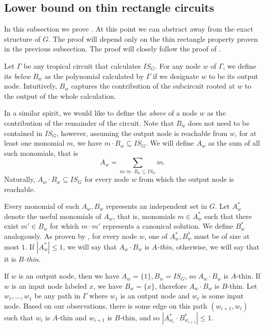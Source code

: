 \documentclass[11pt,a4paper]{article}
\begin{document}
\subsection{Lower bound on thin rectangle circuits}
In this subsection we prove . At this point we can abstract away from the exact structure of $G$. The proof will depend only on the thin rectangle property proven in the previous subsection. The proof will closely follow the proof of \cite[Lemma 2.18]{Jukna2023}.

Let $\Gamma$ be any tropical circuit that calculates $IS_G$. For any node $w$ of $\Gamma$, we define its \emph{below} $B_w$ as the polynomial calculated by $\Gamma$ if we designate $w$ to be its output node. Intuitively, $B_w$ captures the contribution of the subcircuit rooted at $w$ to the output of the whole calculation.

In a similar spirit, we would like to define the \emph{above} of a node $w$ as the contribution of the remainder of the circuit. Note that $B_w$ does not need to be contained in $IS_G$, however, assuming the output node is reachable from $w$, for at least one monomial $m$, we have $m \cdot B_w \subseteq IS_G$. We will define $A_w$ as the sum of all such monomials, that is
$$
    A_w = \sum_{m:m \cdot B_w \subseteq IS_G} m.
$$
Naturally, $A_w \cdot B_w \subseteq IS_G$ for every node $w$ from which the output node is reachable.

Every monomial of each $A_w, B_w$ represents an independent set in $G$. Let $A_w^*$ denote the useful monomials of $A_w$, that is, monomials $m \in A_w^*$ such that there exist $m' \in B_w$ for which $m \cdot m'$ represents a canonical solution. We define $B_w^*$ analogously. As proven by , for every node $w$, one of $A_w^*, B_w^*$ must be of size at most $1$. If $|A_w^*| \leq 1$, we will say that $A_w \cdot B_w$ is \emph{$A$-thin}, otherwise, we will say that it is \emph{$B$-thin}.

If $w$ is an output node, then we have $A_w = \{1\}, B_w = IS_G$, so $A_w \cdot B_w$ is $A$-thin. If $w$ is an input node labeled $x$, we have $B_w = \{x\}$, therefore $A_w \cdot B_w$ is $B$-thin. Let $w_\ell, \dots, w_1$ be any path in $\Gamma$ where $w_1$ is an output node and $w_\ell$ is some input node. Based on our observations, there is some edge on this path $(w_{i+1}, w_i)$ such that $w_i$ is $A$-thin and $w_{i + 1}$ is $B$-thin, and so $|A_{w_i}^* \cdot B_{w_{i+1}}^*| \leq 1$.
\end{document}
